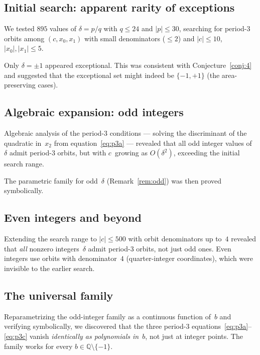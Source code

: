 \documentclass[11pt]{article}
\theoremstyle{definition}
\theoremstyle{remark}
\begin{document}
\subsection{Initial search: apparent rarity of exceptions}\label{sec:initial}

We tested $895$ values of $\delta = p/q$ with $q \leq 24$ and $|p| \leq 30$,
searching for period-$3$ orbits among $(c, x_0, x_1)$ with small denominators
($\leq 2$) and $|c| \leq 10$, $|x_0|, |x_1| \leq 5$.

Only $\delta = \pm 1$ appeared exceptional.  This was consistent with
Conjecture~\ref{conj:4} and suggested that the exceptional set might indeed
be $\{-1, +1\}$ (the area-preserving cases).

\subsection{Algebraic expansion: odd integers}

Algebraic analysis of the period-$3$ conditions --- solving the discriminant
of the quadratic in~$x_2$ from equation~\eqref{eq:p3a} --- revealed that
all odd integer values of~$\delta$ admit period-$3$ orbits, but with
$c$~growing as $O(\delta^2)$, exceeding the initial search range.

The parametric family for odd~$\delta$ (Remark~\ref{rem:odd}) was then
proved symbolically.

\subsection{Even integers and beyond}

Extending the search range to $|c| \leq 500$ with orbit denominators up to~$4$
revealed that \emph{all} nonzero integers~$\delta$ admit period-$3$ orbits,
not just odd ones.  Even integers use orbits with denominator~$4$
(quarter-integer coordinates), which were invisible to the earlier search.

\subsection{The universal family}

Reparametrizing the odd-integer family as a continuous function of~$b$ and
verifying symbolically, we discovered that the three period-$3$
equations~\eqref{eq:p3a}--\eqref{eq:p3c} vanish \emph{identically as
polynomials in~$b$}, not just at integer points.
The family works for every $b \in \mathbb{Q} \setminus \{-1\}$.
\end{document}
